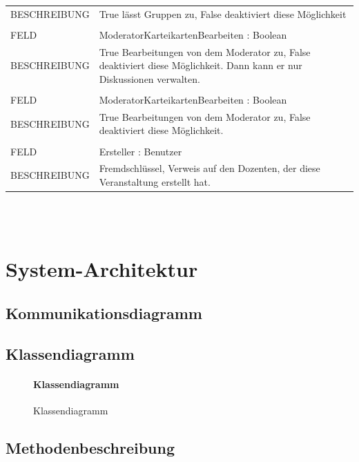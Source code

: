 \documentclass[12pt,a4paper]{article}
\begin{document}
\begin{tabular}{|lp{12cm}|}
BESCHREIBUNG	&  True lässt Gruppen zu, False deaktiviert diese Möglichkeit \\
				&  \\
FELD		    &  ModeratorKarteikartenBearbeiten : Boolean\\ 
BESCHREIBUNG	&  True Bearbeitungen von dem Moderator zu, False deaktiviert diese Möglichkeit. Dann kann er nur Diskussionen verwalten. \\
				&\\
FELD		    &  ModeratorKarteikartenBearbeiten : Boolean\\ 
BESCHREIBUNG	&  True Bearbeitungen von dem Moderator zu, False deaktiviert diese Möglichkeit. \\
				&\\
FELD		    &  Ersteller : Benutzer\\ 
BESCHREIBUNG	&  Fremdschlüssel, Verweis auf den Dozenten, der diese Veranstaltung erstellt hat. \\
\hline
\end{tabular}\\\\


\section{System-Architektur}

\subsection{Kommunikationsdiagramm}

\subsection{Klassendiagramm}

\begin{figure}[H]
	\centering
	\paragraph{Klassendiagramm}
	\caption{Klassendiagramm}
	\label{Klassendiagramm des Teilsystems}
\end{figure}

\subsection{Methodenbeschreibung}
\end{document}
